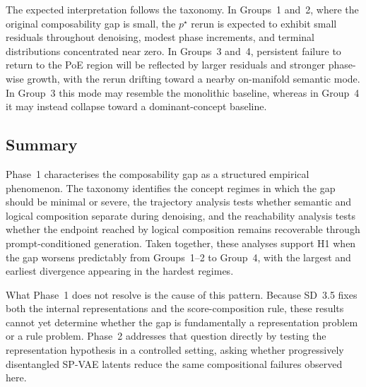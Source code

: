 The expected interpretation follows the taxonomy. 
In Groups~1 and~2, where the original composability gap is small, the $p^\star$ rerun is expected to exhibit small residuals throughout denoising, modest phase increments, and terminal distributions concentrated near zero. 
In Groups~3 and~4, persistent failure to return to the PoE region will be reflected by larger residuals and stronger phase-wise growth, with the rerun drifting toward a nearby on-manifold semantic mode. 
In Group~3 this mode may resemble the monolithic baseline, whereas in Group~4 it may instead collapse toward a dominant-concept baseline.

\subsection{Summary}
\label{subsec:p1_predictions}

Phase~1 characterises the composability gap as a structured empirical phenomenon. The taxonomy
identifies the concept regimes in which the gap should be minimal or severe, the trajectory analysis
tests whether semantic and logical composition separate during denoising, and the reachability
analysis tests whether the endpoint reached by logical composition remains recoverable through
prompt-conditioned generation. Taken together, these analyses support H1 when the gap worsens
predictably from Groups~1--2 to Group~4, with the largest and earliest divergence appearing in the
hardest regimes.

What Phase~1 does not resolve is the cause of this pattern. Because SD~3.5 fixes both the internal
representations and the score-composition rule, these results cannot yet determine whether the gap
is fundamentally a representation problem or a rule problem. Phase~2 addresses that question
directly by testing the representation hypothesis in a controlled setting, asking whether
progressively disentangled SP-VAE latents reduce the same compositional failures observed here.
